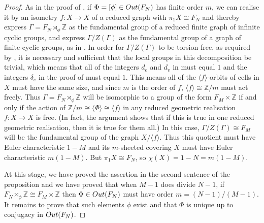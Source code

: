 \documentclass[11pt, a4 paper]{amsart}
\numberwithin{equation}{section}
\theoremstyle{remark}
\theoremstyle{definition}
\def\Z{\mathbb Z}
\def\G{\Gamma}
\def\outN{{\rm{Out}}(F_N)}
\def\G{\Gamma}
\def\<{\langle}
\def\>{\rangle}
\begin{document}
\begin{proof} 
	As in the proof of , 
	if $\Phi = [\phi]\in\outN$ has finite order $m$, 
	we can realise it by an isometry $f:X\to X$ 
	of a reduced graph with $\pi_1X\cong F_N$ 
	and thereby express $\G=F_N\rtimes_{\phi}\Z$ 
	as the fundamental group 
	of a reduced finite graph of infinite cyclic groups, 
	and express $\G/Z(\G)$ as the fundamental group 
	of a graph of finite-cyclic groups, as in . 
	In order for $\G/Z(\G)$ to be torsion-free, 
	as required by , 
	it is necessary and sufficient
	that the local groups in this decomposition be trivial, 
	which means that 
	all of the integers $d_e$ and $d_v$ in  
	must equal $1$ and the integers $\delta_e$ 
	in the proof of  must equal $1$. 
	This means all of the $\<f\>$-orbits of cells in $X$ 
	must have the same size, 
	and since $m$ is the order of $f$, 
	$\<f\>\cong\Z/m$ must act freely. 
	Thus $\G=F_N\rtimes_{\phi}\Z$ will be 
	isomorphic to a group of the form $F_M\times\Z$ if and only if 
	the action of $\Z/m\cong\<\Phi\>\cong\< f\>$ 
	in any reduced geometric realisation $f:X\to X$ is free. 
	(In fact, the argument shows that 
	if this is true in one reduced geometric realisation, 
	then it is true for them all.) 
	In this case, $\G/Z(\G)\cong F_M$ will be 
	the fundamental group of the graph $X/\<f\>$. 
	Thus this quotient must have Euler characteristic $1-M$ 
	and its $m$-sheeted covering $X$ 
	must have Euler characteristic $m(1-M)$. 
	But $\pi_1X\cong F_N$, so $\chi(X) = 1-N = m(1-M)$. 
	
	At this stage, we have proved the assertion 
	in the second sentence of the proposition 
	and we have proved that when $M-1$ does divide $N-1$, 
	if $F_N\rtimes_{\phi}\Z\cong F_M\times\Z$ 
	then $\Phi\in\outN$ must have order $m=(N-1)/(M-1)$. 
	It remains to prove that such elements $\phi$ exist 
	and that $\Phi$ is unique up to conjugacy in $\outN$. 
	

\end{proof}
\end{document}
